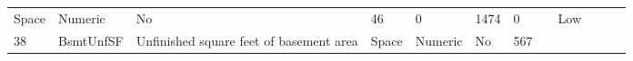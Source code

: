 \documentclass[11pt]{article}
\begin{document}
\begin{longtable}[]{@{}llllllllllll@{}}
\begin{minipage}[t]{0.04\columnwidth}
Space\strut
\end{minipage} & \begin{minipage}[t]{0.04\columnwidth}\raggedright\strut
Numeric\strut
\end{minipage} & \begin{minipage}[t]{0.04\columnwidth}\raggedright\strut
No\strut
\end{minipage} & \begin{minipage}[t]{0.04\columnwidth}\raggedright\strut
46\strut
\end{minipage} & \begin{minipage}[t]{0.04\columnwidth}\raggedright\strut
0\strut
\end{minipage} & \begin{minipage}[t]{0.04\columnwidth}\raggedright\strut
1474\strut
\end{minipage} & \begin{minipage}[t]{0.04\columnwidth}\raggedright\strut
0\strut
\end{minipage} & \begin{minipage}[t]{0.04\columnwidth}\raggedright\strut
\strut
\end{minipage} & \begin{minipage}[t]{0.04\columnwidth}\raggedright\strut
Low\strut
\end{minipage}\tabularnewline
\begin{minipage}[t]{0.04\columnwidth}\raggedright\strut
38\strut
\end{minipage} & \begin{minipage}[t]{0.04\columnwidth}\raggedright\strut
BsmtUnfSF\strut
\end{minipage} & \begin{minipage}[t]{0.04\columnwidth}\raggedright\strut
Unfinished square feet of basement area\strut
\end{minipage} & \begin{minipage}[t]{0.04\columnwidth}\raggedright\strut
Space\strut
\end{minipage} & \begin{minipage}[t]{0.04\columnwidth}\raggedright\strut
Numeric\strut
\end{minipage} & \begin{minipage}[t]{0.04\columnwidth}\raggedright\strut
No\strut
\end{minipage} & \begin{minipage}[t]{0.04\columnwidth}\raggedright\strut
567\strut
\end{minipage} & \begin{minipage}[t]{0.04\columnwidth}\raggedright\strut

\end{minipage}
\end{longtable}
\end{document}
